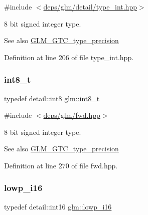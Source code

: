 {\ttfamily \#include $<$\hyperlink{type__int_8hpp}{deps/glm/detail/type\+\_\+int.\+hpp}$>$}

8 bit signed integer type. \begin{DoxySeeAlso}{See also}
\hyperlink{group__gtc__type__precision}{G\+L\+M\+\_\+\+G\+T\+C\+\_\+type\+\_\+precision} 
\end{DoxySeeAlso}


Definition at line 206 of file type\+\_\+int.\+hpp.

\mbox{\label{group__gtc__type__precision_ga673898d450b2a91186f3c4f40c5f8633}} 
\subsubsection{\texorpdfstring{int8\+\_\+t}{int8\_t}}
{\footnotesize\ttfamily typedef detail\+::int8 \hyperlink{group__gtc__type__precision_ga673898d450b2a91186f3c4f40c5f8633}{glm\+::int8\+\_\+t}}



{\ttfamily \#include $<$\hyperlink{fwd_8hpp}{deps/glm/fwd.\+hpp}$>$}

8 bit signed integer type. \begin{DoxySeeAlso}{See also}
\hyperlink{group__gtc__type__precision}{G\+L\+M\+\_\+\+G\+T\+C\+\_\+type\+\_\+precision} 
\end{DoxySeeAlso}


Definition at line 270 of file fwd.\+hpp.

\mbox{\label{group__gtc__type__precision_gaf7bbfd31bcec25a416ea94d09efb5451}} 
\subsubsection{\texorpdfstring{lowp\+\_\+i16}{lowp\_i16}}
{\footnotesize\ttfamily typedef detail\+::int16 \hyperlink{group__gtc__type__precision_gaf7bbfd31bcec25a416ea94d09efb5451}{glm\+::lowp\+\_\+i16}}



